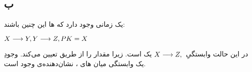 \documentclass{article}
\begin{document}
\subsection{ب}
یک  زمانی وجود دارد که ها این چنین باشند:
\begin{latin}
$
\\
X\longrightarrow Y,\\
Y\longrightarrow Z,\\
PK=X\\
\\
$
\end{latin}
در این حالت وابستگیِ
$
X\longrightarrow Z,\\
$
یک  است. زیرا  مقدار  را از طریق 
 تعیین می‌کند. وجودِ یک وابستگی میان های ، نشان‌دهنده‌ی وجود  است.
\end{document}
